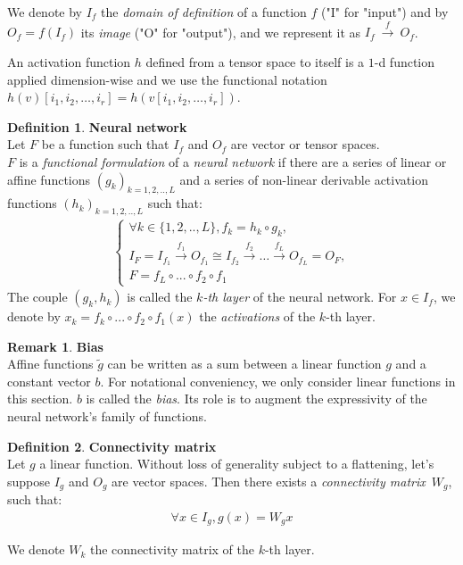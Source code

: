 \documentclass{article}
\theoremstyle{definition}
\newtheorem{definition}{Definition}[section]
\newtheorem{remark}{Remark}
\newcommand{\ovec}{}
\begin{document}
We denote by $I_f$ the \textit{domain of definition} of a function $f$ ("I" for "input") and by $O_f = f(I_f)$ its \textit{image} ("O" for "output"), and we represent it as $I_f~\xrightarrow{f}~O_f$.

An activation function $h$ defined from a tensor space to itself is a $1$-d function applied dimension-wise and we use the functional notation $h(v)[i_1, i_2, \ldots, i_r] = h(v[i_1, i_2, \ldots, i_r])$.

\begin{definition}\textbf{Neural network}\\
\label{nndef}
{Let $F$ be a function such that $I_f$ and $O_f$ are vector or tensor spaces.\\
$F$ is a \emph{functional formulation} of a \emph{neural network} if there are a series of linear or affine functions $(g_k)_{k=1,2,..,L}$ and a series of non-linear derivable activation functions $(h_k)_{k=1,2,..,L}$ such that:
\begin{gather*}
\left\{
  \begin{array}{l}
    \forall k \in \{1,2,..,L\}, f_k = h_k \circ g_k, \\
    I_F = I_{f_1} \xrightarrow{f_1} O_{f_1} \cong I_{f_2} \xrightarrow{f_2} \dots \xrightarrow{f_L} O_{f_L} = O_F, \\
    F = f_{L} \circ ... \circ f_{2} \circ f_1
  \end{array}
\right.
\end{gather*}
The couple $(g_k, h_k)$ is called the \emph{$k$-th layer} of the neural network.
For $\ovec{x} \in I_f$, we denote by $\ovec{x_k} = f_k \circ ... \circ f_{2} \circ f_1 (\ovec{x})$ the \emph{activations} of the $k$-th layer.
}
\end{definition}

\begin{remark}\textbf{Bias}\\
Affine functions $\widetilde{g}$ can be written as a sum between a linear function $g$ and a constant vector $b$. For notational conveniency, we only consider linear functions in this section. $b$ is called the \emph{bias}. Its role is to augment the expressivity of the neural network's family of functions.
\end{remark}

\begin{definition}\textbf{Connectivity matrix}\\
Let $g$ a linear function. Without loss of generality subject to a flattening, let's suppose $I_g$ and $O_g$ are vector spaces. Then there exists a \emph{connectivity matrix}~$W_g$, such that:
\begin{gather*}
\forall \ovec{x} \in I_g, g(\ovec{x}) = W_g\ovec{x}
\end{gather*}
\end{definition}
We denote $W_k$ the connectivity matrix of the $k$-th layer.
\end{document}
